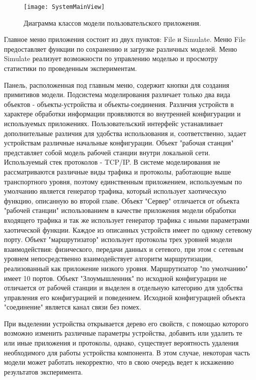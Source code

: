     \begin{figure}[h!]\center
        \texttt{[image: SystemMainView]}
        \caption{Диаграмма классов модели пользовательского приложения. } \label{Pic10}
    \end{figure}

    Главное меню приложения состоит из двух пунктов: File и Simulate. Меню File предоставляет функции по сохранению и загрузке различных моделей. Меню Simulate реализует возможности по управлению моделью и просмотру статистики по проведенным экспериментам.

    Панель, расположенная под главным меню, содержит кнопки для создания примитивов модели. Подсистема моделирования различает только два вида объектов - объекты-устройства и объекты-соединения. Различия устройств в характере обработки информации проявляются во внутренней конфигурации и используемых приложениях. Пользовательский интерфейс устанавливает дополнительные различия для удобства использования и, соответственно, задает устройствам различные начальные конфигурации. Объект "рабочая станция" представляет собой модель рабочей станции внутри локальной сети. Используемый стек протоколов - TCP/IP. В системе моделирования не рассматриваются различные виды трафика и протоколы, работающие выше транспортного уровня, поэтому единственным приложением, используемым по умолчанию является генератор трафика, который использует хаотическую функцию, описанную во второй главе. Объект "Сервер" отличается от объекта "рабочей станции" использованием в качестве приложения модели обработки входящего трафика и так же использует генератор трафика с иными параметрами хаотической функции. Каждое из описанных устройств имеет по одному сетевому порту. Объект "маршрутизатор" использует протоколы трех уровней модели взаимодействия: физического, передачи данных и сетевого, при этом с сетевым уровнем непосредственно взаимодействует алгоритм маршрутизации, реализованный как приложение низкого уровня. Маршрутизатор "по умолчанию" имеет 10 портов. Объект "Злоумышленник" по исходной конфигурации не отличается от рабочей станции и выделен в отдельную категорию для удобства управления его конфигурацией и поведением. Исходной конфигурацией объекта "соединение" является канал связи без помех.

    При выделении устройства открывается дерево его свойств, с помощью которого возможно изменить различные параметры устройства, добавить или удалить те или иные приложения и протоколы, однако, существует вероятность удаления необходимого для работы устройства компонента. В этом случае, некоторая часть модели может работать некорректно, что в свою очередь ведет к искажению результатов эксперимента.

